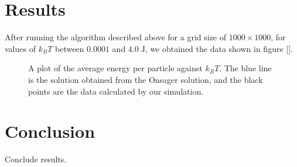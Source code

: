 \documentclass[11pt]{article}
\begin{document}
	\section{Results}
	
	After running the algorithm described above for a grid size of $1000 \times 1000$, for values of $k_B T$ between $0.0001$ and $4.0\;\mathrm{J}$, we obtained the data shown in figure [].
	\begin{figure}[H]
		\begin{center}
		\end{center}
		\caption{A plot of the average energy per particle against $k_BT$. The blue line is the solution obtained from the Onsager solution, and the black points are the data calculated by our simulation.}
	\end{figure}
	
	\section{Conclusion}
	
	Conclude results.
	
	\newpage
	 
	
\end{document}
